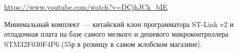 
\url{https://www.youtube.com/watch?v=DCjhJCk_bIE}

\href{https://www.aliexpress.com/item/FREE-SHIPPING-ST-Link-V2-stlink-mini-STM8STM32-STLINK-simulator-download-programming-With-Cover/1814606455.html}{}
\href{https://www.aliexpress.com/item/48-MHz-STM32F030F4P6-Small-Systems-Development-Board-CORTEX-M0-Core-32bit-Mini-System-Development-Panels/32831635311.html}{}

Минимальный комплект\ --- китайский клон программатора ST-Link v2 и отладочная
плата на базе самого мелкого и дешевого микроконтроллера STM32F030F4P6 (55р в
розницу в самом жлобском магазине).

